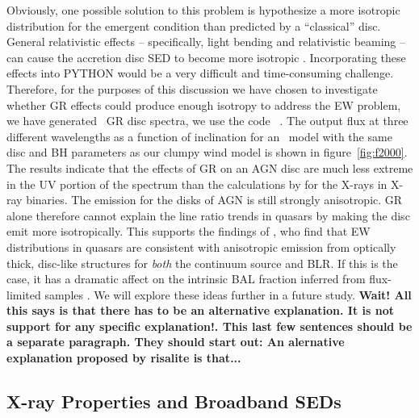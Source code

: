\documentclass[preprint, a4paper, 11pt]{aastex}
\begin{document}
Obviously,  one possible solution to this problem is hypothesize a more isotropic distribution for the emergent condition than predicted by a ``classical'' disc. 
General relativistic effects -- specifically, light bending
and relativistic beaming -- can cause 
the accretion disc SED to become more isotropic \citep[e.g.][]{zhang1997,munozdarias2013}.  Incorporating these effects into {\sc PYTHON} would be a very difficult and time-consuming challenge. Therefore, for the purposes of this discussion we have chosen to investigate whether GR effects could produce enough isotropy to address the EW problem, we have generated 
\ GR disc spectra, we use the code \agn\ \citep{hubeny2000,davishubeny2006,davis2007}. 
The output flux at three different wavelengths
as a function of inclination for an \agn\ model with the same disc and BH parameters
as our clumpy wind model is shown in figure~\ref{fig:f2000}.  The results indicate that 
the effects of GR on an AGN disc are much less extreme 
in the UV portion of the spectrum than the calculations
by \cite{zhang1997} for the X-rays in X-ray binaries.
The emission for the disks of AGN is still strongly anisotropic.
GR alone therefore cannot explain the line ratio trends in quasars by making the disc
emit more isotropically. This supports the findings of \cite{risaliti2011}, 
who find that EW distributions in quasars are consistent with anisotropic emission 
from optically thick, 
disc-like structures for {\em both} the continuum source and BLR. 
If this is the case, it has a dramatic affect on the intrinsic
BAL fraction inferred from flux-limited samples \citep{goodrich1997,krolikvoit1998}.
We will explore these ideas further in a future study.  
{\bf Wait!  All this says is that there has to be an alternative explanation.
It is not support for any specific explanation!. This last few sentences should
be a separate paragraph.  They should start out: An alernative explanation proposed 
by risalite is that...}



\subsection{X-ray Properties and Broadband SEDs}
\end{document}
